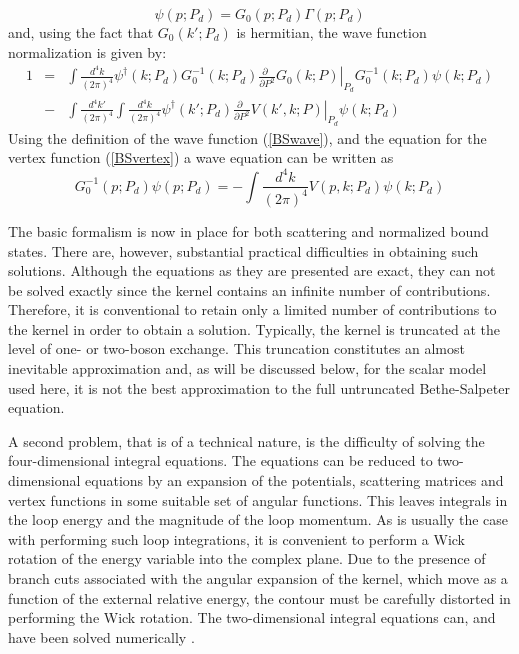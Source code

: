 \documentclass[mythesis.tex]{subfiles}
\begin{document}
\begin{equation}
\psi(p;P_d)= G_0(p;P_d)\Gamma(p;P_d)\label{BSwave}
\end{equation}
and, using the fact that $G_0(k';P_d)$ is hermitian, the wave function
normalization is given by:
\begin{eqnarray}
1&=&\int\frac{d^4k}{(2\pi)^4}\psi^\dagger(k;P_d)G^{-1}_0(k;P_d)
\left. \frac{\partial ~~}{\partial P^2}G_0(k;P)\right|_{P_d}G^{-1}_0(k;P_d)
\psi(k;P_d)
\nonumber\\
&-&\int\frac{d^4k'}{(2\pi)^4}\int\frac{d^4k}{(2\pi)^4}
\psi^\dagger(k';P_d)\left. \frac{\partial ~~}{\partial P^2}
V(k',k;P)\right|_{P_d} \psi(k;P_d) \label{normal}
\end{eqnarray}
Using the definition of the wave function (\ref{BSwave}), and the equation
for the vertex function (\ref{BSvertex}) a wave equation can be written
as
%
\begin{equation}
G^{-1}_0(p;P_d)\psi(p;P_d)=-\int\frac{d^4k}{(2\pi)^4}V(p,k;P_d)\psi(k;P_d)
\label{BSwaveEq}
\end{equation}

The basic formalism is now in place for both scattering and normalized bound
states. There are, however, substantial practical difficulties in obtaining
such solutions. Although the equations as they are presented are exact,
they can not be solved exactly since the kernel contains an infinite
number of contributions. Therefore, it is conventional to retain only a
limited number of contributions to the kernel in order to obtain a solution.
Typically, the kernel is truncated at the level of one- or two-boson
exchange. This truncation constitutes an almost inevitable approximation
and, as will be discussed below,  for the scalar
model used here, it is not the best approximation to the
full untruncated Bethe-Salpeter equation.

A second problem, that is of a technical nature, is the difficulty of
solving the four-dimensional integral equations. The equations can be reduced
to two-dimensional equations by an expansion of the potentials, scattering
matrices and vertex functions in some suitable set of angular functions.
This leaves integrals in the loop energy and the magnitude of the loop
momentum. As is usually the case with performing such loop integrations, it
is convenient to perform a Wick rotation of the energy variable into the
complex plane. Due to the presence of branch cuts associated with the
angular expansion of the kernel, which move as a function of the external
relative energy, the contour must be carefully distorted in performing
the Wick rotation. The two-dimensional integral equations can, and have
been solved numerically \cite{Tjon,Zuilhof,Umnikov}.
\end{document}
